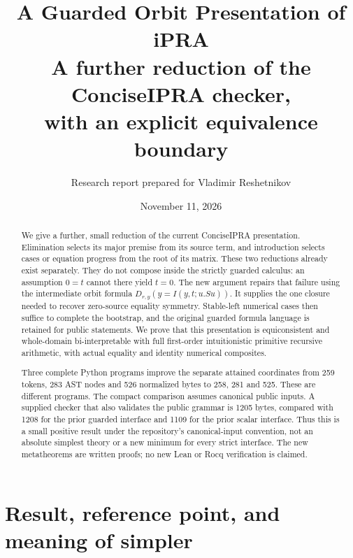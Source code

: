 \documentclass[11pt,letterpaper]{article}
\title{\color{ink}\bfseries A Guarded Orbit Presentation of iPRA\\[8pt]
\large A further reduction of the ConciseIPRA checker,\\with an explicit equivalence boundary}
\author{Research report prepared for Vladimir Reshetnikov}
\date{November 11, 2026}
\theoremstyle{definition}\newtheorem{definition}[theorem]{Definition}
\theoremstyle{remark}\newtheorem{remark}[theorem]{Remark}
\begin{document}
\maketitle
\begin{abstract}
We give a further, small reduction of the current ConciseIPRA presentation.
Elimination selects its major premise from its source term, and introduction
selects cases or equation progress from the root of its matrix. These two
reductions already exist separately. They do not compose inside the strictly
guarded calculus: an assumption $0=t$ cannot there yield $t=0$.
The new argument repairs that failure using the intermediate orbit formula
$D_{r,y}(y=I(y,t;u.Su))$. It supplies the one closure needed to recover
zero-source equality symmetry. Stable-left numerical cases then suffice to
complete the bootstrap, and the original guarded formula language is retained
for public statements. We prove that this presentation is equiconsistent and
whole-domain bi-interpretable with full first-order intuitionistic primitive
recursive arithmetic, with actual equality and identity numerical composites.

Three complete Python programs improve the separate attained coordinates
from 259 tokens, 283 AST nodes and 526 normalized bytes to 258, 281 and 525.
These are different programs. The compact comparison assumes canonical
public inputs. A supplied checker that also validates the public grammar is
1205 bytes, compared with 1208 for the prior guarded interface and 1109 for
the prior scalar interface. Thus this is a small positive result under the
repository's canonical-input convention, not an absolute simplest theory or
a new minimum for every strict interface. The new metatheorems are written
proofs; no new Lean or Rocq verification is claimed.
\end{abstract}

\begin{center}
\end{center}
\newpage
\tableofcontents
\newpage

\section{Result, reference point, and meaning of simpler}
\end{document}
